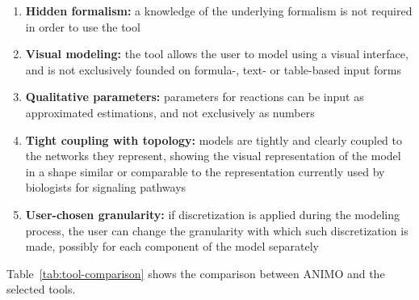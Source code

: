 \documentclass{bmcart}
\begin{document}
\begin{enumerate}
  \item {\bf Hidden formalism:} a knowledge of the underlying formalism is not required in order to use the tool
  \item {\bf Visual modeling:} the tool allows the user to model using a visual interface, and is not exclusively
      founded on formula-, text- or table-based input forms
  \item {\bf Qualitative parameters:} parameters for reactions can be input as approximated estimations, and not exclusively as numbers
  \item {\bf Tight coupling with topology:} models are tightly and clearly coupled to the networks they represent, showing the visual
      representation of the model in a shape similar or comparable to the representation currently used by biologists
      for signaling pathways
  \item {\bf User-chosen granularity:} if discretization is applied during the modeling process, the user can change the granularity
      with which such discretization is made, possibly for each component of the model separately
\end{enumerate}
Table~\ref{tab:tool-comparison} shows the comparison between ANIMO and the selected tools.
\end{document}
